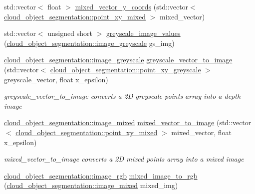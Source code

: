 \begin{DoxyCompactItemize}
\item 
std\+::vector$<$ float $>$ \hyperlink{namespacecloud__object__segmentation_1_1image__processing_aa3e811d27ba50661bd7251f73e70c936}{mixed\+\_\+vector\+\_\+y\+\_\+coords} (std\+::vector$<$ \hyperlink{classcloud__object__segmentation_1_1point__xy__mixed}{cloud\+\_\+object\+\_\+segmentation\+::point\+\_\+xy\+\_\+mixed} $>$ mixed\+\_\+vector)
\item 
std\+::vector$<$ unsigned short $>$ \hyperlink{namespacecloud__object__segmentation_1_1image__processing_aabaf352bf3f8997a3b8989c3231d378b}{greyscale\+\_\+image\+\_\+values} (\hyperlink{classcloud__object__segmentation_1_1image__greyscale}{cloud\+\_\+object\+\_\+segmentation\+::image\+\_\+greyscale} gs\+\_\+img)
\item 
\hyperlink{classcloud__object__segmentation_1_1image__greyscale}{cloud\+\_\+object\+\_\+segmentation\+::image\+\_\+greyscale} \hyperlink{namespacecloud__object__segmentation_1_1image__processing_a295ad7d27e571f0f242861e5fd66c9e1}{greyscale\+\_\+vector\+\_\+to\+\_\+image} (std\+::vector$<$ \hyperlink{classcloud__object__segmentation_1_1point__xy__greyscale}{cloud\+\_\+object\+\_\+segmentation\+::point\+\_\+xy\+\_\+greyscale} $>$ greyscale\+\_\+vector, float x\+\_\+epsilon)
\begin{DoxyCompactList}\small\item\em greyscale\+\_\+vector\+\_\+to\+\_\+image converts a 2D greyscale points array into a depth image \end{DoxyCompactList}\item 
\hyperlink{classcloud__object__segmentation_1_1image__mixed}{cloud\+\_\+object\+\_\+segmentation\+::image\+\_\+mixed} \hyperlink{namespacecloud__object__segmentation_1_1image__processing_aaaf12bb9c8354ed139dec661004fb260}{mixed\+\_\+vector\+\_\+to\+\_\+image} (std\+::vector$<$ \hyperlink{classcloud__object__segmentation_1_1point__xy__mixed}{cloud\+\_\+object\+\_\+segmentation\+::point\+\_\+xy\+\_\+mixed} $>$ mixed\+\_\+vector, float x\+\_\+epsilon)
\begin{DoxyCompactList}\small\item\em mixed\+\_\+vector\+\_\+to\+\_\+image converts a 2D mixed points array into a mixed image \end{DoxyCompactList}\item 
\hyperlink{classcloud__object__segmentation_1_1image__rgb}{cloud\+\_\+object\+\_\+segmentation\+::image\+\_\+rgb} \hyperlink{namespacecloud__object__segmentation_1_1image__processing_aa22bf6c35f0d0ca3435aa896e671f819}{mixed\+\_\+image\+\_\+to\+\_\+rgb} (\hyperlink{classcloud__object__segmentation_1_1image__mixed}{cloud\+\_\+object\+\_\+segmentation\+::image\+\_\+mixed} mixed\+\_\+img)

\end{DoxyCompactItemize}
